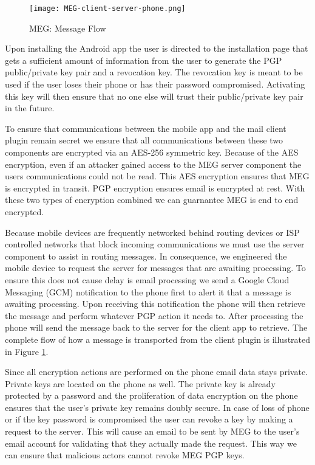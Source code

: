 \documentclass[10pt]{article}
\begin{document}
\begin{figure}[h]
    \texttt{[image: MEG-client-server-phone.png]}
    \caption{MEG: Message Flow}
    \label{fig:Flow}
\end{figure}
\begin{multicols}{2}
\par Upon installing the Android app the user is directed to the installation page that gets a sufficient amount of information from the user to generate the PGP public/private key pair and a revocation key. The revocation key is meant to be used if the user loses their phone or has their password compromised. Activating this key will then ensure that no one else will trust their public/private key pair in the future.
\par To ensure that communications between the mobile app and the mail client plugin remain secret we ensure that all communications between these two components are encrypted via an AES-256 symmetric key. Because of the AES encryption, even if an attacker gained access to the MEG server component the users communications could not be read. This AES encryption ensures that MEG is encrypted in transit. PGP encryption ensures email is encrypted at rest. With these two types of encryption combined we can guarnantee MEG is end to end encrypted.
\par Because mobile devices are frequently networked behind routing devices or ISP controlled networks that block incoming communications we must use the server component to assist in routing messages. In consequence, we engineered the mobile device to request the server for messages that are awaiting processing. To ensure this does not cause delay is email processing we send a Google Cloud Messaging (GCM) notification to the phone first to alert it that a message is awaiting processing. Upon receiving this notification the phone will then retrieve the message and perform whatever PGP action it needs to. After processing the phone will send the message back to the server for the client app to retrieve. The complete flow of how a message is transported from the client plugin is illustrated in Figure \ref{fig:Flow}.
\par Since all encryption actions are performed on the phone email data stays private. Private keys are located on the phone as well. The private key is already protected by a password and the proliferation of data encryption on the phone ensures that the user's private key remains doubly secure. In case of loss of phone or if the key password is compromised the user can revoke a key by making a request to the server. This will cause an email to be sent by MEG to the user's email account for validating that they actually made the request. This way we can ensure that malicious actors cannot revoke MEG PGP keys.
\end{multicols}
\end{document}
